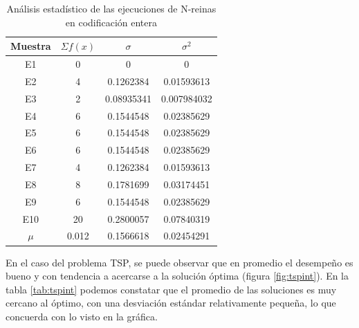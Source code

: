 \documentclass[letterpaper,12pt]{article}
\theoremstyle{definition}
\begin{document}
\begin{table}
  \begin{center}
    \begin{tabular}{cccc}
      \toprule 
        Muestra & \(\Sigma f(x)\) & \(\sigma\)  & \(\sigma^2\)  \\
        \midrule
        \rowcolor{black!20} E1 & 0 & 0 & 0 \\
        E2 & 4 & 0.1262384 & 0.01593613 \\
        \rowcolor{black!20} E3 & 2 & 0.08935341 & 0.007984032\\
        E4 & 6 & 0.1544548 & 0.02385629\\
        \rowcolor{black!20} E5 & 6 & 0.1544548 & 0.02385629 \\
        E6 & 6 & 0.1544548 & 0.02385629 \\
        \rowcolor{black!20} E7 & 4 & 0.1262384 & 0.01593613 \\
        E8 & 8 & 0.1781699 & 0.03174451\\
        \rowcolor{black!20} E9 & 6 & 0.1544548 & 0.02385629 \\
        E10 & 20 & 0.2800057 & 0.07840319 \\
        \rowcolor{black!20} \(\mu\) & 0.012 & 0.1566618 & 0.02454291 \\ 
        \bottomrule
      \end{tabular}
  \end{center}
  \caption{Análisis estadístico de las ejecuciones de N-reinas en codificación entera}
  \label{tab:nqint}  
\end{table}

En el caso del problema TSP, se puede observar que en promedio el desempeño es bueno y con tendencia a acercarse a la solución óptima (figura \ref{fig:tspint}). En la tabla \ref{tab:tspint} podemos constatar que el promedio de las soluciones es muy cercano al óptimo, con una desviación estándar relativamente pequeña, lo que concuerda con lo visto en la gráfica. 
\end{document}
